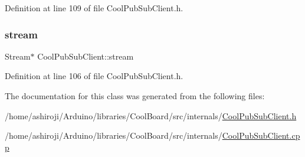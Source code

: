 Definition at line 109 of file Cool\+Pub\+Sub\+Client.\+h.

\mbox{\label{class_cool_pub_sub_client_a7a92417b317e7bd9502ed37752111705}} 
\subsubsection{\texorpdfstring{stream}{stream}}
{\footnotesize\ttfamily Stream$\ast$ Cool\+Pub\+Sub\+Client\+::stream\hspace{0.3cm}{\ttfamily [private]}}



Definition at line 106 of file Cool\+Pub\+Sub\+Client.\+h.



The documentation for this class was generated from the following files\+:\begin{DoxyCompactItemize}
\item 
/home/ashiroji/\+Arduino/libraries/\+Cool\+Board/src/internals/\hyperlink{_cool_pub_sub_client_8h}{Cool\+Pub\+Sub\+Client.\+h}\item 
/home/ashiroji/\+Arduino/libraries/\+Cool\+Board/src/internals/\hyperlink{_cool_pub_sub_client_8cpp}{Cool\+Pub\+Sub\+Client.\+cpp}\end{DoxyCompactItemize}
